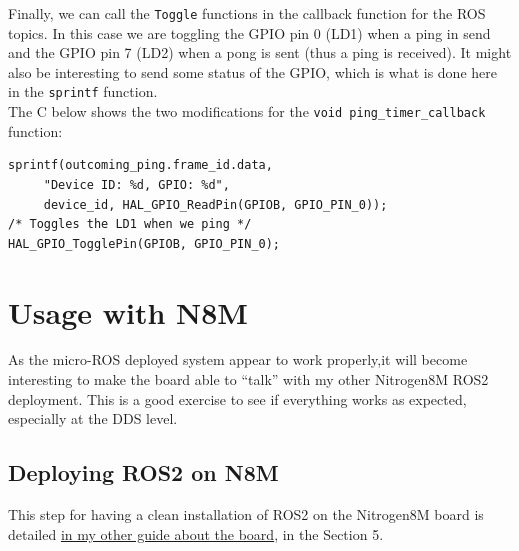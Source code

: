 \documentclass[10pt]{article}
\begin{document}
Finally, we can call the \verb|Toggle| functions in the callback function for the ROS topics. In this case we are toggling the GPIO pin 0 (LD1) when a ping in send and the GPIO pin 7 (LD2) when a pong is sent (thus a ping is received).
It might also be interesting to send some status of the GPIO, which is what is done here in the \verb|sprintf| function.\\
The C below shows the two modifications for the \verb|void ping_timer_callback| function:
\begin{tcolorbox}
\begin{verbatim}
sprintf(outcoming_ping.frame_id.data,
     "Device ID: %d, GPIO: %d",
     device_id, HAL_GPIO_ReadPin(GPIOB, GPIO_PIN_0));
/* Toggles the LD1 when we ping */
HAL_GPIO_TogglePin(GPIOB, GPIO_PIN_0);
\end{verbatim}
\end{tcolorbox}


\pagebreak
\section{Usage with N8M}
\label{sec:usage-with-n8m}
As the micro-ROS deployed system appear to work properly,it will become interesting
to make the board able to ``talk'' with my other Nitrogen8M ROS2 deployment.
This is a good exercise to see if everything works as expected, especially at
the DDS level.

\subsection{Deploying ROS2 on N8M}
\label{sec:deploying-ros2-n8m}
This step for having a clean installation of ROS2 on the Nitrogen8M board is detailed \href{https://gitlab.com/nitrogen8m/documentation/}{in my other guide about the board}, in the Section 5.
\end{document}

